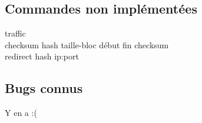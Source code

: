 \subsection{Commandes non implémentées}
\begin{description}
    \item[traffic]
    \item[checksum hash taille-bloc début fin checksum] 
    \item[redirect hash ip:port]

\end{description}
\subsection{Bugs connus}
Y en a :(
